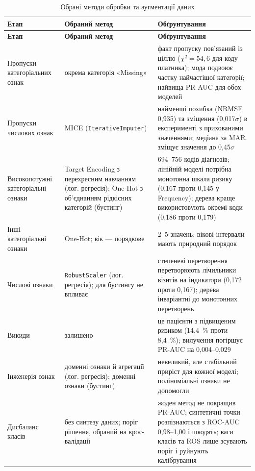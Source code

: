\documentclass[14pt,a4paper]{extreport}
\begin{document}
{\small
\renewcommand{\arraystretch}{1.15}
\begin{longtable}{|p{3.1cm}|p{3.9cm}|p{8.6cm}|}
\caption{Обрані методи обробки та аугментації даних}
\label{tab:choices} \\
\hline
\textbf{Етап} & \textbf{Обраний метод} & \textbf{Обґрунтування} \\
\hline
\endfirsthead
\hline
\textbf{Етап} & \textbf{Обраний метод} & \textbf{Обґрунтування} \\
\hline
\endhead
Пропуски категоріальних ознак & окрема категорія «Missing» & факт пропуску пов'язаний із ціллю ($\chi^2 = 54{,}6$ для коду платника); мода подвоює частку найчастішої категорії; найвища PR-AUC для обох моделей \\
\hline
Пропуски числових ознак & MICE (\texttt{IterativeImputer}) & найменші похибка (NRMSE 0,935) та зміщення (0,017$\sigma$) в експерименті з прихованими значеннями; медіана за MAR зміщує значення до 0,45$\sigma$ \\
\hline
Високопотужні категоріальні ознаки & Target Encoding з перехресним навчанням (лог. регресія); One-Hot з об'єднанням рідкісних категорій (бустинг) & 694--756 кодів діагнозів; лінійній моделі потрібна монотонна шкала ризику (0,167 проти 0,145 у Frequency); дерева краще використовують окремі коди (0,186 проти 0,179) \\
\hline
Інші категоріальні ознаки & One-Hot; вік --- порядкове & 2--5 значень; вікові інтервали мають природний порядок \\
\hline
Числові ознаки & \texttt{RobustScaler} (лог. регресія); для бустингу не впливає & степеневі перетворення перетворюють лічильники візитів на індикатори (0,172 проти 0,167); дерева інваріантні до монотонних перетворень \\
\hline
Викиди & залишено & це пацієнти з підвищеним ризиком (14,4~\% проти 8,4~\%); вилучення погіршує PR-AUC на 0,004--0,029 \\
\hline
Інженерія ознак & доменні ознаки й агрегації (лог. регресія); доменні ознаки (бустинг) & невеликий, але стабільний приріст для кожної моделі; поліноміальні ознаки не допомогли \\
\hline
Дисбаланс класів & без синтезу даних; поріг рішення, обраний на крос-валідації & жоден метод не покращив PR-AUC; синтетичні точки розпізнаються з ROC-AUC 0,98--1,00 і шкодять; ваги класів та ROS лише зсувають поріг і руйнують калібрування \\
\hline
\end{longtable}
}
\end{document}
